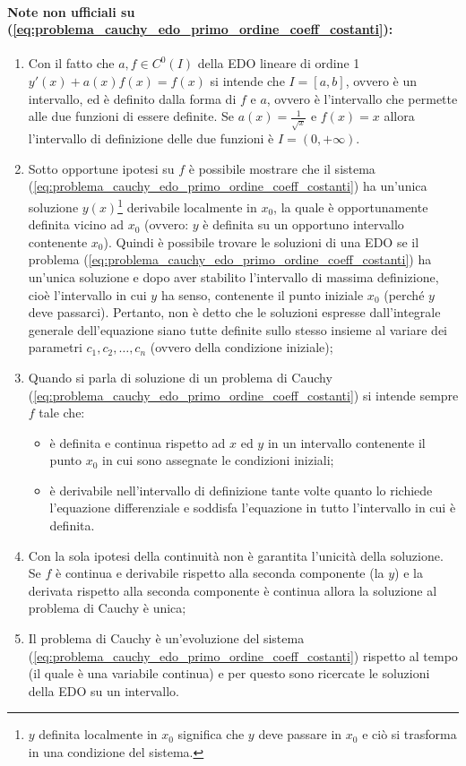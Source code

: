 \paragraph{Note non ufficiali su (\ref{eq:problema_cauchy_edo_primo_ordine_coeff_costanti}):}
\begin{enumerate}
	\item Con il fatto che $a,f\in C^0(I)$ della EDO lineare di ordine 1 $y'(x) + a(x)f(x)=f(x)$ si intende che  $I=[a,b]$, ovvero è un intervallo, ed è definito dalla forma di $f$ e $a$, ovvero è l'intervallo che permette alle due funzioni di essere definite. Se $a(x)=\frac{1}{\sqrt{x}}$ e $f(x)=x$ allora l'intervallo di definizione delle due funzioni è $I=(0, +\infty)$.
    \item Sotto opportune ipotesi su $f$ è possibile mostrare che il sistema (\ref{eq:problema_cauchy_edo_primo_ordine_coeff_costanti}) ha un'unica soluzione $y(x)$\footnote{$y$ definita localmente in $x_0$ significa che $y$ deve passare in $x_0$ e ciò si trasforma in una condizione del sistema.} derivabile localmente in $x_0$, la quale è opportunamente definita vicino ad $x_0$ (ovvero: $y$ è definita su un opportuno intervallo contenente $x_0$). Quindi è possibile trovare le soluzioni di una EDO se il problema (\ref{eq:problema_cauchy_edo_primo_ordine_coeff_costanti}) ha un'unica soluzione e dopo aver stabilito l'intervallo di massima definizione, cioè l'intervallo in cui $y$ ha senso, contenente il punto iniziale $x_0$ (perché $y$ deve passarci). Pertanto, non è detto che le soluzioni espresse dall'integrale generale dell'equazione siano tutte definite sullo stesso insieme al variare dei parametri $c_1 , c_2 ,\hdots ,c_n$ (ovvero della condizione iniziale);
    \item Quando si parla di soluzione di un problema di Cauchy (\ref{eq:problema_cauchy_edo_primo_ordine_coeff_costanti}) si intende sempre $f$ tale che:
    \begin{itemize}
        \item è definita e continua rispetto ad $x$ ed $y$ in un intervallo contenente il punto $x_0$ in cui sono assegnate le condizioni iniziali;
        \item è derivabile nell'intervallo di definizione tante volte quanto lo richiede l'equazione differenziale e soddisfa l'equazione in tutto l'intervallo in cui è definita.
    \end{itemize}
    \item Con la sola ipotesi della continuità non è garantita l'unicità della soluzione. Se $f$ è continua e derivabile rispetto alla seconda componente (la $y$) e la derivata rispetto alla seconda componente è continua allora la soluzione al problema di Cauchy è unica;
    \item Il problema di Cauchy è un'evoluzione del sistema (\ref{eq:problema_cauchy_edo_primo_ordine_coeff_costanti}) rispetto al tempo (il quale è una variabile continua) e per questo sono ricercate le soluzioni della EDO su un intervallo.
\end{enumerate}

